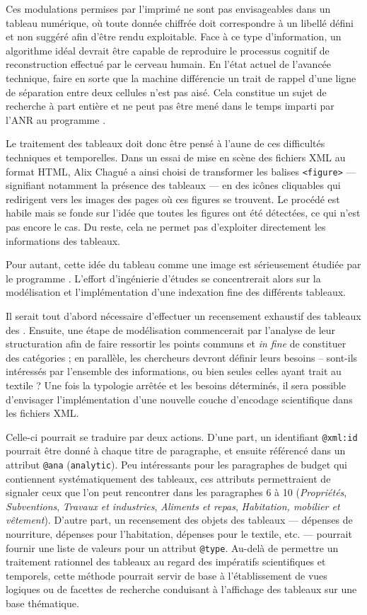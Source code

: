 Ces modulations permises par l'imprimé ne sont pas envisageables dans un tableau numérique, où toute donnée chiffrée doit correspondre à un libellé défini et non suggéré afin d'être rendu exploitable. Face à ce type d'information, un algorithme idéal devrait être capable de reproduire le processus cognitif de reconstruction effectué par le cerveau humain. En l'état actuel de l'avancée technique, faire en sorte que la machine différencie un trait de rappel d'une ligne de séparation entre deux cellules n'est pas aisé. Cela constitue un sujet de recherche à part entière et ne peut pas être mené dans le temps imparti par l'ANR au programme \timeus.

Le traitement des tableaux doit donc être pensé à l'aune de ces difficultés techniques et temporelles. Dans un essai de mise en scène des fichiers XML au format HTML, Alix Chagué a ainsi choisi de transformer les balises \texttt{<figure>} --- signifiant notamment la présence des tableaux --- en des icônes cliquables qui redirigent vers les images des pages où ces figures se trouvent. Le procédé est habile mais se fonde sur l'idée que toutes les figures ont été détectées, ce qui n'est pas encore le cas. Du reste, cela ne permet pas d'exploiter directement les informations des tableaux.

Pour autant, cette idée du tableau comme une image est sérieusement étudiée par le programme \timeus. L'effort d'ingénierie d'études se concentrerait alors sur la modélisation et l'implémentation d'une indexation fine des différents tableaux.

Il serait tout d'abord nécessaire d'effectuer un recensement exhaustif des tableaux des \odm. Ensuite, une étape de modélisation commencerait par l'analyse de leur structuration afin de faire ressortir les points communs et \textit{in fine} de constituer des catégories ; en parallèle, les chercheurs devront définir leurs besoins -- sont-ils intéressés par l'ensemble des informations, ou bien seules celles ayant trait au textile ? Une fois la typologie arrêtée et les besoins déterminés, il sera possible d'envisager l'implémentation d'une nouvelle couche d'encodage scientifique dans les fichiers XML.

Celle-ci pourrait se traduire par deux actions. D'une part, un identifiant \texttt{@xml:id} pourrait être donné à chaque titre de paragraphe, et ensuite référencé dans un attribut \texttt{@ana} (\texttt{analytic}). Peu intéressants pour les paragraphes de budget qui contiennent systématiquement des tableaux, ces attributs permettraient de signaler ceux que l'on peut rencontrer dans les paragraphes 6 à 10 (\textit{Propriétés}, \textit{Subventions}, \textit{Travaux et industries}, \textit{Aliments et repas}, \textit{Habitation, mobilier et vêtement}). D'autre part, un recensement des objets des tableaux --- dépenses de nourriture, dépenses pour l'habitation, dépenses pour le textile, etc. --- pourrait fournir une liste de valeurs pour un attribut \texttt{@type}. Au-delà de permettre un traitement rationnel des tableaux au regard des impératifs scientifiques et temporels, cette méthode pourrait servir de base à l'établissement de vues logiques ou de facettes de recherche conduisant à l'affichage des tableaux sur une base thématique.

